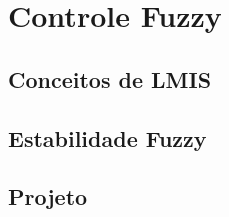 %

\chapter{Controle Fuzzy} \label{capControle}

\section{Conceitos de LMIS}

\section{Estabilidade Fuzzy}

\section{Projeto}

%


